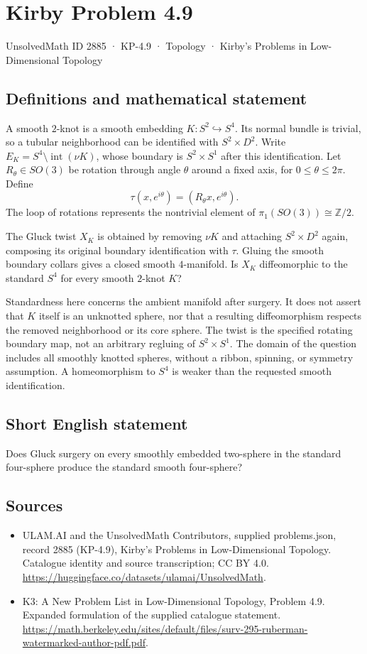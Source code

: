\documentclass[11pt,a4paper]{article}
\begin{document}
\section*{Kirby Problem 4.9}\label{2885}
{\small UnsolvedMath ID 2885 · KP-4.9 · Topology · Kirby's Problems in Low-Dimensional Topology}
\subsection{Definitions and mathematical statement}
A smooth $2$-knot is a smooth embedding $K:S^2\hookrightarrow S^4$.
Its normal bundle is trivial, so a tubular neighborhood can be
identified with $S^2\times D^2$. Write
$E_K=S^4\setminus\operatorname{int}(\nu K)$, whose boundary is
$S^2\times S^1$ after this identification.
Let $R_\theta\in SO(3)$ be rotation through angle $\theta$ around
a fixed axis, for $0\le\theta\le2\pi$. Define
\[
 \tau(x,e^{i\theta})=(R_\theta x,e^{i\theta}).
\]
The loop of rotations represents the nontrivial element of
$\pi_1(SO(3))\cong\mathbb Z/2$.

The Gluck twist $X_K$ is obtained by removing $\nu K$ and attaching
$S^2\times D^2$ again, composing its original boundary identification
with $\tau$. Gluing the smooth boundary collars gives a closed smooth
$4$-manifold. Is $X_K$ diffeomorphic to the standard $S^4$ for every
smooth $2$-knot $K$?

Standardness here concerns the ambient manifold after surgery. It does
not assert that $K$ itself is an unknotted sphere, nor that a resulting
diffeomorphism respects the removed neighborhood or its core sphere.
The twist is the specified rotating boundary map, not an arbitrary
regluing of $S^2\times S^1$. The domain of the question includes all
smoothly knotted spheres, without a ribbon, spinning, or symmetry
assumption. A homeomorphism to $S^4$ is weaker than the requested
smooth identification.
\subsection{Short English statement}
Does Gluck surgery on every smoothly embedded two-sphere in the standard four-sphere produce the standard smooth four-sphere?
\subsection{Sources}
\begin{itemize}
\item[S1] ULAM.AI and the UnsolvedMath Contributors, supplied problems.json, record 2885 (KP-4.9), Kirby's Problems in Low-Dimensional Topology. Catalogue identity and source transcription; CC BY 4.0.
\url{https://huggingface.co/datasets/ulamai/UnsolvedMath}.
\item[S2] K3: A New Problem List in Low-Dimensional Topology, Problem 4.9. Expanded formulation of the supplied catalogue statement.
\url{https://math.berkeley.edu/sites/default/files/surv-295-ruberman-watermarked-author-pdf.pdf}.
\end{itemize}
\end{document}
